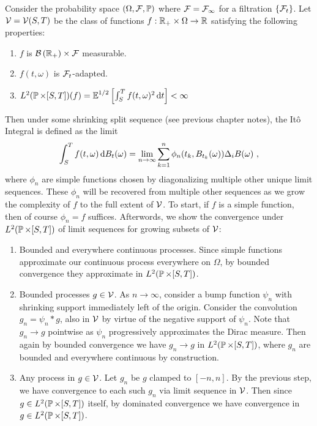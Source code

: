 \documentclass{article}
\begin{document}
\begin{definition}[It\^{o} Integral]
  Consider the probability space \((\Omega,\mcF,\P)\) where \(\mcF=\mcF_\infty\) for a filtration \(\ca{\mcF_t}\). Let \(\mcV =\mcV(S, T)\) be the class of functions \(f: \R_+\times \Omega\rightarrow\R\) satisfying the following properties:
  \begin{enumerate}
  \item \(f\) is \(\mathcal{B}\pa{\R_+}\times\mcF\) measurable.
  \item \(f(t, \omega)\) is \(\mcF_t\)-adapted.
  \item \(L^2(\P \times [S,T])(f)=\E^{1/2}\ha{\int_S^T f(t,\omega)^2\d{t}}<\infty\)
  \end{enumerate}

  Then under some shrinking split sequence (see previous chapter notes), the It\^{o} Integral is defined as the limit
  \[
\int_S^Tf(t, \omega)\d{B_t(\omega)}=\lim_{n\rightarrow\infty}\sum_{k=1}^n\phi_n(t_k, B_{t_k}(\omega))\Delta_i B(\omega)\,\,,
\]
where \(\phi_n\) are simple functions chosen by diagonalizing multiple other unique limit sequences. These \(\phi_n\) will be recovered from multiple other sequences as we grow the complexity of \(f\) to the full extent of \(\mcV\). To start, if \(f\) is a simple function, then of course \(\phi_n=f\) suffices. Afterwords, we show the convergence under \(L^2(\P \times [S, T])\) of limit sequences for growing subsets of $\mcV$:
\begin{enumerate}
\item Bounded and everywhere continuous processes. Since simple functions approximate our continuous process everywhere on \(\Omega\), by bounded convergence they approximate in \(L^2(\P \times [S, T])\).
\item Bounded processes \(g\in \mcV\). As \(n\rightarrow\infty\), consider a bump function \(\psi_n\) with shrinking support immediately left of the origin. Consider the convolution \(g_n=\psi_n * g\), also in \(\mcV\) by virtue of the negative support of \(\psi_n\). Note that \(g_n\rightarrow g\) pointwise as \(\psi_n\) progressively approximates the Dirac measure. Then again by bounded convergence we have \(g_n\rightarrow g\) in \(L^2(\P \times [S, T])\), where \(g_n\) are bounded and everywhere continuous by construction.
\item Any process in \(g\in \mcV\). Let \(g_n\) be \(g\) clamped to \([-n, n]\). By the previous step, we have convergence to each such \(g_n\) via limit sequence in \(\mcV\). Then since \(g\in L^2(\P \times [S,T])\) itself, by dominated convergence we have convergence in \(g\in L^2(\P \times [S,T])\).
\end{enumerate} 
\end{definition}
\end{document}
